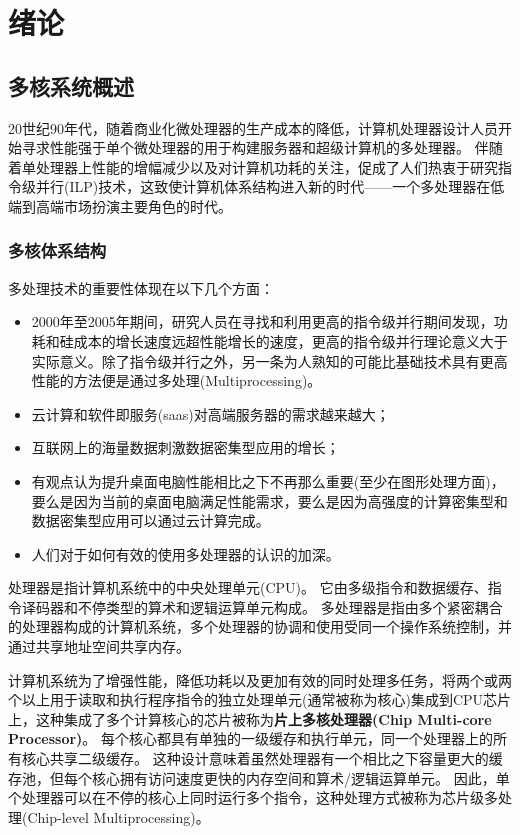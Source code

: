 \chapter{绪\quad 论}

\section{多核系统概述}
20世纪90年代，随着商业化微处理器的生产成本的降低，计算机处理器设计人员开始寻求性能强于单个微处理器的用于构建服务器和超级计算机的多处理器。
伴随着单处理器上性能的增幅减少以及对计算机功耗的关注，促成了人们热衷于研究指令级并行(ILP)技术，这致使计算机体系结构进入新的时代——一个多处理器在低端到高端市场扮演主要角色的时代。

\subsection{多核体系结构}
多处理技术的重要性体现在以下几个方面：
\begin{itemize}
	\item 2000年至2005年期间，研究人员在寻找和利用更高的指令级并行期间发现，功耗和硅成本的增长速度远超性能增长的速度，更高的指令级并行理论意义大于实际意义。除了指令级并行之外，另一条为人熟知的可能比基础技术具有更高性能的方法便是通过多处理(Multiprocessing)。
	\item 云计算和软件即服务(saas)对高端服务器的需求越来越大；
	\item 互联网上的海量数据刺激数据密集型应用的增长；
	\item 有观点认为提升桌面电脑性能相比之下不再那么重要(至少在图形处理方面)，要么是因为当前的桌面电脑满足性能需求，要么是因为高强度的计算密集型和数据密集型应用可以通过云计算完成。
	\item 人们对于如何有效的使用多处理器的认识的加深。
\end{itemize}

处理器是指计算机系统中的中央处理单元(CPU)。
它由多级指令和数据缓存、指令译码器和不停类型的算术和逻辑运算单元构成。
多处理器是指由多个紧密耦合的处理器构成的计算机系统，多个处理器的协调和使用受同一个操作系统控制，并通过共享地址空间共享内存\cite{hennessy2011computer}。

计算机系统为了增强性能，降低功耗以及更加有效的同时处理多任务，将两个或两个以上用于读取和执行程序指令的独立处理单元(通常被称为核心)集成到CPU芯片上，这种集成了多个计算核心的芯片被称为\textbf{片上多核处理器(Chip Multi-core Processor)}\cite{geer2005chip}。
每个核心都具有单独的一级缓存和执行单元，同一个处理器上的所有核心共享二级缓存。
这种设计意味着虽然处理器有一个相比之下容量更大的缓存池，但每个核心拥有访问速度更快的内存空间和算术/逻辑运算单元。
因此，单个处理器可以在不停的核心上同时运行多个指令，这种处理方式被称为芯片级多处理(Chip-level Multiprocessing)。

